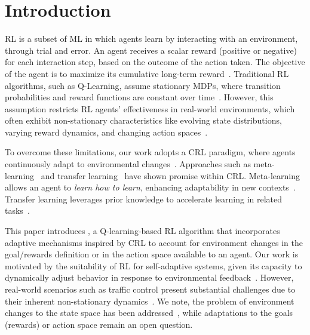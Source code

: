 
\section{Introduction}
\label{sec:introduction}

\acf{RL} is a subset of \ac{ML} in which agents learn by interacting with an environment, 
through trial and error. An agent receives a scalar reward (positive or negative) for each interaction 
step, based on the outcome of the action taken. The objective of the agent is to maximize its cumulative long-term 
reward~\cite{sutton18}. Traditional \ac{RL} algorithms, such as Q-Learning, assume stationary 
\acp{MDP}, where transition probabilities and reward functions are constant over 
time~\cite{meta-rl-traffic}. However, this assumption restricts \ac{RL} agents' effectiveness in 
real-world environments, which often exhibit non-stationary characteristics like evolving state 
distributions, varying reward dynamics, and changing action 
spaces~\cite{khetarpal2022continualreinforcementlearningreview}.

To overcome these limitations, our work adopts a \acf{CRL} paradigm, where agents continuously 
adapt to environmental changes~\cite{abel2023definitioncontinualreinforcementlearning}. Approaches 
such as meta-learning~\cite{zintgraf21} and transfer learning~\cite{zhuang20} have shown promise 
within \ac{CRL}. Meta-learning allows an agent to \emph{learn how to learn}, enhancing adaptability in 
new contexts~\cite{beck2024surveymetareinforcementlearning}. Transfer learning leverages prior 
knowledge to accelerate learning in related tasks~\cite{chen2022transferredqlearning}.

This paper introduces \adaptiverl, a Q-learning-based \ac{RL} algorithm that incorporates adaptive 
mechanisms inspired by \ac{CRL} to account for environment changes in the goal/rewards definition 
or in the action space available to an agent. Our work is motivated by the suitability of \ac{RL} for 
self-adaptive systems, given its capacity to dynamically adjust behavior in response to environmental 
feedback~\cite{HENRICHS2022106940}. However, real-world scenarios such as traffic control 
present substantial challenges due to their inherent non-stationary dynamics~\cite{meta-rl-traffic}. 
We note, the problem of environment changes to the state space has been addressed~\cite{gueriau19}, 
while adaptations to the goals (\ie rewards) or action space remain an open question.


